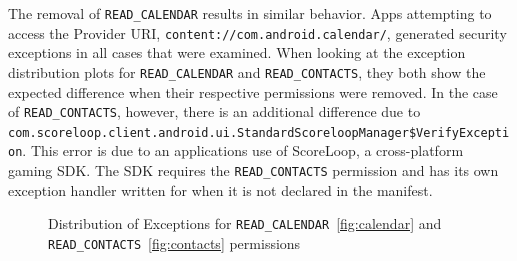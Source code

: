 The removal of \texttt{READ\_CALENDAR} results in similar behavior. Apps attempting to access the Provider URI, \texttt{content://com.android.calendar/}, generated security exceptions in all cases that were examined.  When looking at the exception distribution plots for \texttt{READ\_CALENDAR} and \texttt{READ\_CONTACTS}, they both show the expected difference when their respective permissions were removed.  In the case of \texttt{READ\_CONTACTS}, however, there is an additional difference due to \texttt{com.scoreloop.client.android.ui.StandardScoreloopManager\$VerifyException}.  This error is due to an applications use of ScoreLoop, a cross-platform gaming SDK.  The SDK requires the \texttt{READ\_CONTACTS} permission and has its own exception handler written for when it is not declared in the manifest.

\begin{figure}[h!]
\hfill
{}
\hfill
{}
\hfill
\caption{Distribution of Exceptions for \texttt{READ\_CALENDAR}~\ref{fig:calendar} and \texttt{READ\_CONTACTS}~\ref{fig:contacts} permissions}
\end{figure}

